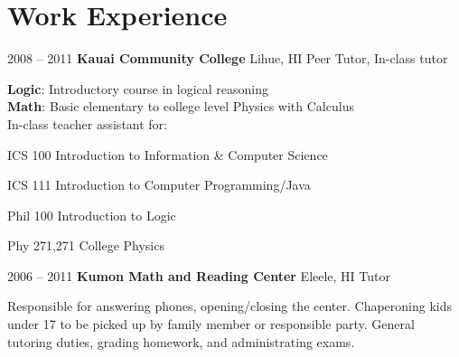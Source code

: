 \documentclass{tccv}
\begin{document}
\section{Work Experience}
	 \begin{eventlist}
		 \item {2008 -- 2011}
			 {\textbf{Kauai Community College}           Lihue, HI}
			 {Peer Tutor, In-class tutor}

			\textbf{Logic}: Introductory course in logical reasoning \\
			\textbf{Math}: Basic elementary to college level Physics with Calculus \\
			In-class teacher assistant for:\\
			 \begin{factlist}
				 \item{ICS 100}
					 {Introduction to Information \& Computer Science}
				 \item{ICS 111}
					 {Introduction to Computer Programming/Java}
				 \item{Phil 100}
					 {Introduction to Logic}
				 \item{Phy 271,271}
					 {College Physics}
			 \end{factlist}

		\item {2006 -- 2011}
			{\textbf{Kumon Math and Reading Center}       Eleele, HI}
			{Tutor}

			Responsible for answering phones, opening/closing the center.
			Chaperoning kids under 17 to be picked up by family member or responsible party.
			General tutoring duties, grading homework, and administrating exams.
				
	\end{eventlist}

\end{document}

